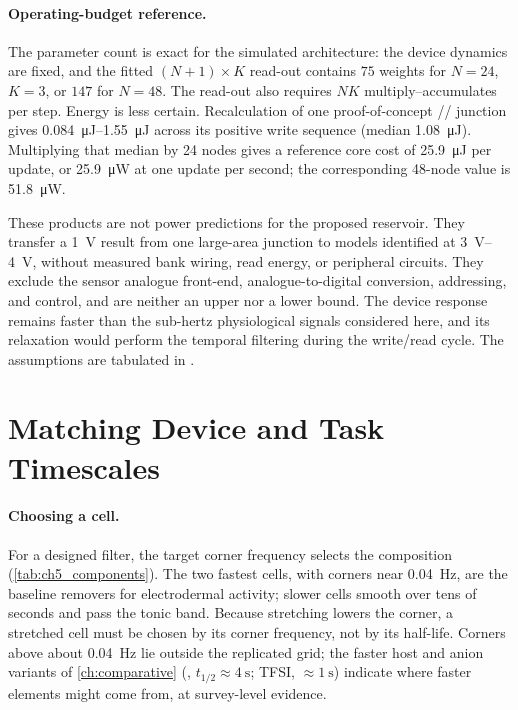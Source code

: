 \documentclass[12pt, twoside]{report}
\begin{document}
\paragraph{Operating-budget reference.} The parameter count is exact for the simulated architecture: the device dynamics are fixed, and the fitted $(N{+}1)\times K$ read-out contains $75$ weights for $N=24$, $K=3$, or $147$ for $N=48$. The read-out also requires $NK$ multiply--accumulates per step. Energy is less certain. Recalculation of one proof-of-concept \SY{}/\Hybrane{}/\LiTf{} junction gives \SIrange{0.084}{1.55}{\micro\joule} across its positive write sequence (median \SI{1.08}{\micro\joule}). Multiplying that median by 24 nodes gives a reference core cost of \SI{25.9}{\micro\joule} per update, or \SI{25.9}{\micro\watt} at one update per second; the corresponding 48-node value is \SI{51.8}{\micro\watt}.

These products are not power predictions for the proposed reservoir. They transfer a \SI{1}{\volt} result from one large-area \Hybrane{} junction to \PEO{} models identified at \SIrange{3}{4}{\volt}, without measured bank wiring, read energy, or peripheral circuits. They exclude the sensor analogue front-end, analogue-to-digital conversion, addressing, and control, and are neither an upper nor a lower bound. The device response remains faster than the sub-hertz physiological signals considered here, and its relaxation would perform the temporal filtering during the write/read cycle. The assumptions are tabulated in .

\section{Matching Device and Task Timescales}\label{sec:ch5_designrules}

\paragraph{Choosing a cell.} For a designed filter, the target corner frequency selects the composition (\cref{tab:ch5_components}). The two fastest cells, with corners near \SI{0.04}{\hertz}, are the baseline removers for electrodermal activity; slower cells smooth over tens of seconds and pass the tonic band. Because stretching lowers the corner, a stretched cell must be chosen by its corner frequency, not by its half-life. Corners above about \SI{0.04}{\hertz} lie outside the replicated grid; the faster host and anion variants of \cref{ch:comparative} (\TMPE{}, \(t_{1/2}\approx\SI{4}{\second}\); TFSI, \(\approx\SI{1}{\second}\)) indicate where faster elements might come from, at survey-level evidence.
\end{document}
